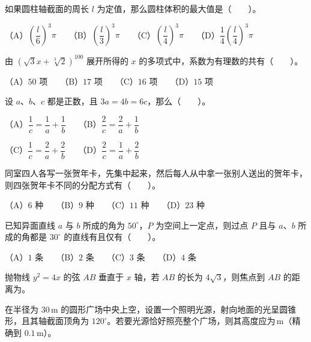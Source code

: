 \begin{question}
如果圆柱轴截面的周长 $l$ 为定值，那么圆柱体积的最大值是\mbox{（　　）}。

（A）$\left(\dfrac{l}{6}\right)^3\pi$　　（B）$\left(\dfrac{l}{3}\right)^3\pi$　　（C）$\left(\dfrac{l}{4}\right)^3\pi$　　（D）$\dfrac14\left(\dfrac{l}{4}\right)^3\pi$

\end{question}
\begin{question}
由 $(\sqrt3x+\sqrt[3]2)^{100}$ 展开所得的 $x$ 的多项式中，系数为有理数的共有\mbox{（　　）}。

（A）$50$ 项　　（B）$17$ 项　　（C）$16$ 项　　（D）$15$ 项

\end{question}
\begin{question}
设 $a\text{、}b\text{、}c$ 都是正数，且 $3a=4b=6c$，那么\mbox{（　　）}。

（A）$\dfrac1c=\dfrac1a+\dfrac1b$　　（B）$\dfrac2c=\dfrac2a+\dfrac1b$\par\vspace*{3pt}

（C）$\dfrac1c=\dfrac2a+\dfrac2b$　　（D）$\dfrac2c=\dfrac1a+\dfrac2b$

\end{question}
\begin{question}
同室四人各写一张贺年卡，先集中起来，然后每人从中拿一张别人送出的贺年卡，则四张贺年卡不同的分配方式有\mbox{（　　）}。

（A）$6$ 种　　（B）$9$ 种　　（C）$11$ 种　　（D）$23$ 种

\end{question}
\begin{question}
已知异面直线 $a$ 与 $b$ 所成的角为 $50^\circ$，$P$ 为空间上一定点，则过点 $P$ 且与 $a\text{、}b$ 所成的角都是 $30^\circ$ 的直线有且仅有\mbox{（　　）}。

（A）$1$ 条　　（B）$2$ 条　　（C）$3$ 条　　（D）$4$ 条

\end{question}
\begin{question}
抛物线 $y^2=4x$ 的弦 $AB$ 垂直于 $x$ 轴，若 $AB$ 的长为 $4\sqrt3$，则焦点到 $AB$ 的距离为\underline{\qquad\qquad}。

\end{question}
\begin{question}
在半径为 $30\,\mathrm m$ 的圆形广场中央上空，设置一个照明光源，射向地面的光呈圆锥形，且其轴截面顶角为 $120^\circ$。若要光源恰好照亮整个广场，则其高度应为\underline{\qquad\qquad}$\,\mathrm m$（精确到 $0.1\,\mathrm m$）。

\end{question}
